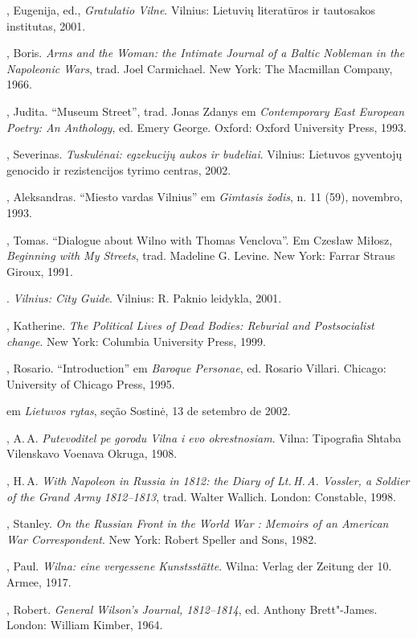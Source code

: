 \begin{bibliohedra}
  , Eugenija, ed., \emph{Gratulatio Vilne}. Vilnius: Lietuvių
  literatūros ir tautosakos institutas, 2001.

  , Boris. \emph{Arms and the Woman: the Intimate Journal of a
  Baltic Nobleman in the Napoleonic Wars}, trad. Joel Carmichael. New
  York: The Macmillan Company, 1966.

  , Judita. ``Museum Street'', trad. Jonas Zdanys em
  \emph{Contemporary East European Poetry: An Anthology}, ed. Emery
  George. Oxford: Oxford University Press, 1993.

  , Severinas. \emph{Tuskulėnai: egzekucijų aukos ir budeliai}.
  Vilnius: Lietuvos gyventojų genocido ir rezistencijos tyrimo centras,
  2002.


, Aleksandras. ``Miesto vardas Vilnius'' em \emph{Gimtasis
žodis}, n. 11 (59), novembro, 1993.

, Tomas. ``Dialogue about Wilno with Thomas Venclova''. Em
Czesław Miłosz, \emph{Beginning with My Streets}, trad. Madeline G.
Levine. New York: Farrar Straus Giroux, 1991.

\titidem. \emph{Vilnius: City Guide}. Vilnius: R. Paknio
leidykla, 2001.

, Katherine. \emph{The Political Lives of Dead Bodies: Reburial
and Postsocialist change}. New York: Columbia University Press, 1999.

, Rosario. ``Introduction'' em \emph{Baroque Personae}, ed.
Rosario Villari. Chicago: University of Chicago Press, 1995.

 em \emph{Lietuvos rytas}, seção
Sostinė, 13 de setembro de 2002.

, A.\,A. \emph{Putevoditel pe gorodu Vilna i evo okrestnosiam}.
Vilna: Tipografia Shtaba Vilenskavo Voenava Okruga, 1908.

, H.\,A. \emph{With Napoleon in Russia in 1812: the Diary of Lt.\,H.\,A. Vossler, a Soldier of the Grand Army 1812--1813}, trad. Walter
Wallich. London: Constable, 1998.

, Stanley. \emph{On the Russian Front in the World War :
Memoirs of an American War Correspondent}. New York: Robert Speller and
Sons, 1982.

, Paul. \emph{Wilna: eine vergessene Kunstsstätte}. Wilna: Verlag
der Zeitung der 10. Armee, 1917.

, Robert. \emph{General Wilson's Journal, 1812--1814}, ed. Anthony
Brett"-James. London: William Kimber, 1964.


\end{bibliohedra}
